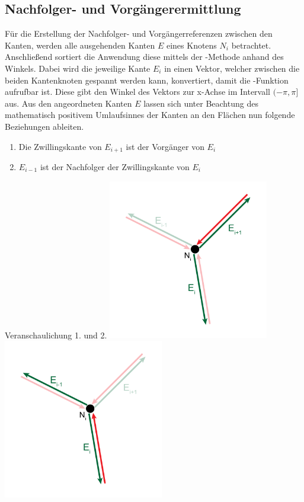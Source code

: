 \subsection{Nachfolger- und Vorgängerermittlung}
Für die Erstellung der Nachfolger- und Vorgängerreferenzen zwischen den Kanten, werden alle ausgehenden Kanten $E$ eines Knotens $N_i$ betrachtet.
Anschließend sortiert die Anwendung diese mittels der -Methode anhand des Winkels.
Dabei wird die jeweilige Kante $E_i$ in einen Vektor, welcher zwischen die beiden Kantenknoten gespannt werden kann, konvertiert, damit die -Funktion aufrufbar ist.
Diese gibt den Winkel des Vektors zur x-Achse im Intervall $(-\pi,\pi]$ aus.
Aus den angeordneten Kanten $E$ lassen sich unter Beachtung des mathematisch positivem Umlaufsinnes der Kanten an den Flächen nun folgende Beziehungen ableiten. 
\begin{enumerate}
	\item Die Zwillingskante von $E_{i+1}$ ist der Vorgänger von $E_i$
	\item $E_{i-1}$ ist der Nachfolger der Zwillingskante von $E_i$ 
\end{enumerate}
\begin{Bild}{Veranschaulichung 1. und 2.}
	\includegraphics[width = 70mm]{Bilder/Beziehung1Kanten}
		\includegraphics[width = 70mm]{Bilder/Beziehung2Kanten}
\end{Bild}
